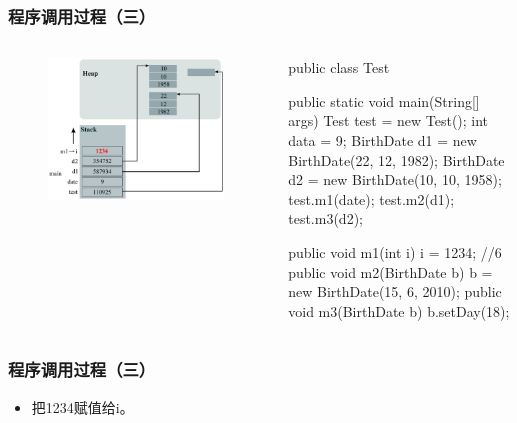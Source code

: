 \documentclass[hyperref={pdfpagelabels=false},compress,table]{beamer} %
\begin{document}
\begin{frame}[fragile] %
\frametitle{程序调用过程（三）}

\begin{columns}
\begin{figure}
\centering
\includegraphics[width=0.98\textwidth]{fig03.pdf}
\end{figure}

\begin{javaCode}\small
public class Test {
  public static void main(String[] args) {
    Test test = new Test(); 
    int data = 9; 
    BirthDate d1 = new BirthDate(22, 12, 1982); 
    BirthDate d2 = new BirthDate(10, 10, 1958); 
    test.m1(date); 
    test.m2(d1);
    test.m3(d2);
  }

  public void m1(int i) {
    i = 1234; //6
  }
  public void m2(BirthDate b) {
    b = new BirthDate(15, 6, 2010);
  }
  public void m3(BirthDate b) {
    b.setDay(18);
  }
}
\end{javaCode}
\end{columns}
\end{frame}

\begin{frame}[fragile] %
\frametitle{程序调用过程（三）}
\begin{itemize}
\item 把1234赋值给i。
\end{itemize}
\end{frame}
\end{document}
